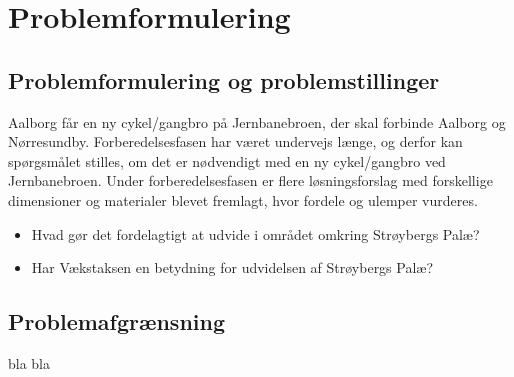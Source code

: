 \chapter{Problemformulering}

\section{Problemformulering og problemstillinger}
Aalborg får en ny cykel/gangbro på Jernbanebroen, der skal forbinde Aalborg og Nørresundby. Forberedelsesfasen har været undervejs længe, og derfor kan spørgsmålet stilles, om det er nødvendigt med en ny cykel/gangbro ved Jernbanebroen. Under forberedelsesfasen er flere løsningsforslag med forskellige dimensioner og materialer blevet fremlagt, hvor fordele og ulemper vurderes.
\begin{itemize} 
	\item Hvad gør det fordelagtigt at udvide i området omkring Strøybergs Palæ? 
	\item Har Vækstaksen en betydning for udvidelsen af Strøybergs Palæ? 
\end{itemize} 

\section{Problemafgrænsning}
bla bla